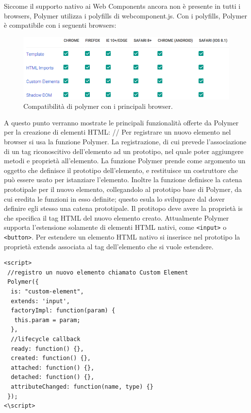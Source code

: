Siccome il supporto nativo ai Web Components ancora non è presente in tutti i browsers, Polymer utilizza i polyfills di webcomponent.js. Con i polyfills, Polymer è compatibile con i seguenti browsers:
\\
\begin{figure}[htb]
 \centering
 \includegraphics[width=1\linewidth]{images/chapter_tecnologie_abilitanti/tecnologie_abilitanti_poly_comp.png}\hfill
 \caption[Polymer e browser compatibili]{Compatibilità di polymer con i principali browser.}
 \label{fig:tecnologie_abilitanti_poly_comp}
\end{figure}
A questo punto verranno mostrate le principali funzionalità offerte da Polymer per la creazione di elementi HTML:
//
Per registrare un nuovo elemento nel browser si usa la funzione Polymer. La registrazione, di cui  prevede l’associazione di un tag riconoscitivo dell’elemento ad un prototipo, nel quale poter aggiungere metodi e proprietà all’elemento. La funzione Polymer prende come argomento un oggetto che definisce il prototipo dell’elemento, e restituisce un costruttore che può essere usato per istanziare l’elemento.
Inoltre la funzione definisce la catena prototipale per il nuovo elemento, collegandolo al prototipo base di Polymer, da cui eredita le funzioni in esso definite; questo esula lo sviluppare dal dover definire egli stesso una catena prototipale.
Il protitopo deve avere la proprietà is che specifica il tag HTML del nuovo elemento creato. Attualmente Polymer supporta l’estensione solamente di elementi HTML nativi, come \texttt{<input>} o \texttt{<button>}. Per estendere un elemento HTML nativo si inserisce nel prototipo la proprietà extends associata al tag dell’elemento che si vuole estendere. 
\begin{lstlisting}[language=HTML5, label={poly_code1}]
<script>
 //registro un nuovo elemento chiamato Custom Element
 Polymer({
  is: "custom-element",
  extends: 'input',
  factoryImpl: function(param) {
   this.param = param;
  },
  //lifecycle callback
  ready: function() {},
  created: function() {},
  attached: function() {},
  detached: function() {},
  attributeChanged: function(name, type) {}
 });
<\script>
\end{lstlisting}
